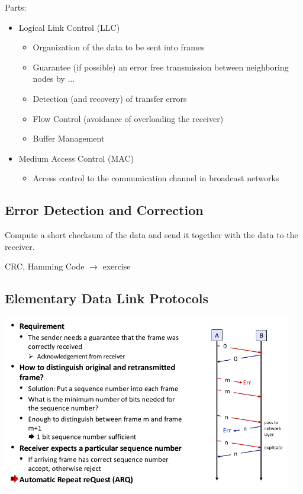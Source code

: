\documentclass[11pt,ngerman]{article}
\begin{document}
Parts:
\begin{itemize}[noitemsep]
\item Logical	Link	Control	(LLC)
\begin{itemize}[noitemsep]
\item  Organization	of	the	data	to	be	sent	into	frames
\item Guarantee	(if	possible)	an	error	free	transmission	between	neighboring nodes	by	...
\item Detection	(and	recovery)	of	transfer	errors
\item Flow	Control	(avoidance	of	overloading	the	receiver)
\item Buffer	Management
\end{itemize}
\item Medium	Access	Control	(MAC)
\begin{itemize}[noitemsep]
\item Access	control	to	the	communication	channel	in	broadcast	networks
\end{itemize}
\end{itemize}

\subsection{Error	Detection	and	Correction}
Compute	a	short	checksum	of	the	data	and	send	it	together	with	
the	data	to	the	receiver.	

CRC, Hamming Code $\rightarrow$ exercise

\subsection{Elementary	Data	Link	Protocols}

\includegraphics[width=5in]{images/Selection_016.png}
\end{document}
